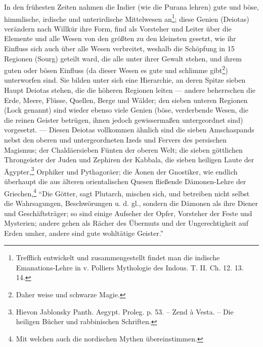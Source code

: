 \documentclass[a4paper, 11pt, oneside, polutonikogreek, german]{article}
\begin{document}
In den frühesten Zeiten nahmen die Indier (wie die Purana lehren) gute und böse, himmlische, irdische und unterirdische Mittelwesen an\footnote{Trefflich entwickelt und zusammengestellt findet man die indische Emanations-Lehre in v. Polliers Mythologie des Indous. T. II. Ch. 12. 13. 14.}; diese Genien (Deiotas) verändern nach Willkür ihre Form, find als Vorsteher und Leiter über die Elemente und alle Wesen von den größten zu den kleinsten gesetzt, wie ihr Einfluss sich auch über alle Wesen verbreitet, weshalb die Schöpfung in 15 Regionen (Sourg) geteilt ward, die alle unter ihrer Gewalt stehen, und ihrem guten oder bösen Einfluss (da dieser Wesen es gute und schlimme gibt\footnote{Daher weise und schwarze Magie.}) unterworfen sind. Sie bilden unter sich eine Hierarchie, an deren Spitze sieben Haupt Deiotas stehen, die die höheren Regionen leiten --- andere beherrschen die Erde, Meere, Flüsse, Quellen, Berge und Wälder; den sieben unteren Regionen (Lock genannt) sind wieder ebenso viele Genien (böse, verderbende Wesen, die die reinen Geister betrügen, ihnen jedoch gewissermaßen untergeordnet sind) vorgesetzt. --- Diesen Deiotas vollkommen ähnlich sind die sieben Amschaspands nebst den oberen und untergeordneten Izeds und Fervers des persischen Magismus; der Chaldäersieben Fünten der oberen Welt; die sieben göttlichen Throngeister der Juden und Zephiren der Kabbala, die sieben heiligen Laute der Ägypter,\footnote{Hievon Jablonsky Panth. Aegypt. Proleg. p. 53. -- Zend à Vesta. -- Die heiligen Bücher und rabbinischen Schriften.} Orphiker und Pythagoräer; die Äonen der Gnostiker, wie endlich überhaupt die aus älteren orientalischen Quesen fließende Dämonen-Lehre der Griechen,\footnote{Mit welchen auch die nordischen Mythen übereinstimmen.} "`Die Götter, sagt Plutarch, mischen sich, und betreiben nicht selbst die Wahrsagungen, Beschwörungen u. d. gl., sondern die Dämonen als ihre Diener und Geschäftsträger; so sind einige Aufseher der Opfer, Vorsteher der Feste und Mysterien; andere gehen als Rächer des Übermuts und der Ungerechtigkeit auf Erden umher, andere sind gute wohltätige Geister."'
\end{document}
